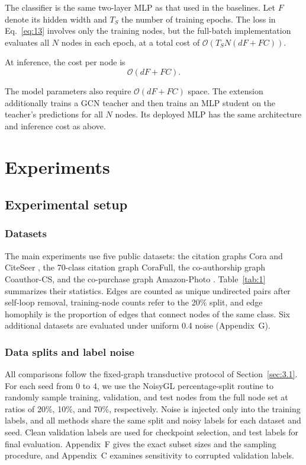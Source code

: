 \documentclass[times,review,10pt]{elsarticle}
\theoremstyle{definition}
\theoremstyle{plain}
\begin{document}
The classifier is the same two-layer MLP as that used in the baselines. Let \(F\) denote its hidden width and \(T_{S}\) the number of training epochs. The loss in Eq.~\eqref{eq:13} involves only the training nodes, but the full-batch implementation evaluates all \(N\) nodes in each epoch, at a total cost of \(\mathcal{O}(T_{S}N(dF + FC))\).\par
\noindent At inference, the cost per node is
\begin{equation}\label{eq:23}
\mathcal{O}(dF + FC).
\end{equation}

The model parameters also require \(\mathcal{O}(dF + FC)\) space. The extension additionally trains a GCN teacher and then trains an MLP student on the teacher's predictions for all \(N\) nodes. Its deployed MLP has the same architecture and inference cost as above.
\section{Experiments}\label{sec:4}

\subsection{Experimental setup}\label{sec:4.1}

\subsubsection{Datasets}\label{sec:4.1.1}

The main experiments use five public datasets: the citation graphs Cora and CiteSeer \cite{ref69}, the 70-class citation graph CoraFull, the co-authorship graph Coauthor-CS, and the co-purchase graph Amazon-Photo \cite{ref70}. Table~\ref{tab:1} summarizes their statistics. Edges are counted as unique undirected pairs after self-loop removal, training-node counts refer to the 20\% split, and edge homophily is the proportion of edges that connect nodes of the same class. Six additional datasets are evaluated under uniform 0.4 noise (Appendix~G).



\subsubsection{Data splits and label noise}\label{sec:4.1.2}

All comparisons follow the fixed-graph transductive protocol of Section~\ref{sec:3.1}. For each seed from 0 to 4, we use the NoisyGL percentage-split routine to randomly sample training, validation, and test nodes from the full node set at ratios of 20\%, 10\%, and 70\%, respectively. Noise is injected only into the training labels, and all methods share the same split and noisy labels for each dataset and seed. Clean validation labels are used for checkpoint selection, and test labels for final evaluation. Appendix~F gives the exact subset sizes and the sampling procedure, and Appendix~C examines sensitivity to corrupted validation labels.
\end{document}
